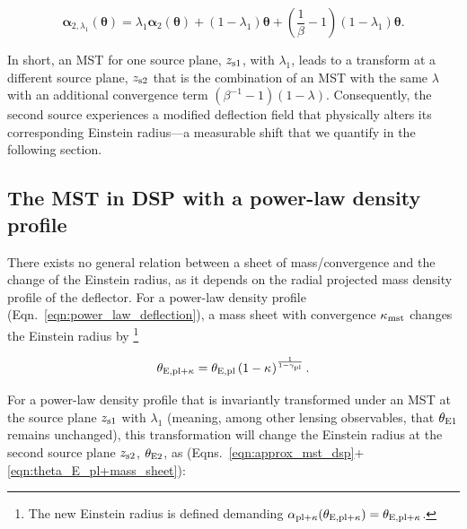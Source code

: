\documentclass[a4paper,11pt]{article}
\begin{document}
\begin{equation} \label{eqn:approx_mst_dsp}
    \boldsymbol{\alpha}_{2, \lambda_1}(\boldsymbol{\theta}) = \lambda_1 \boldsymbol{\alpha}_2(\boldsymbol{\theta}) + (1 - \lambda_{1}) \boldsymbol{\theta} + \left(\frac{1}{\beta} - 1 \right)\left(1 - \lambda_1\right)\boldsymbol{\theta}.
\end{equation}

In short, an MST for one source plane, $z_{\rm s1}$, with $\lambda_1$, leads to a transform at a different source plane, $z_{\rm s2}$ that is the combination of an MST with the same $\lambda$ with an additional convergence term $(\beta^{-1} -1)(1-\lambda)$. Consequently, the second source experiences a modified deflection field that physically alters its corresponding Einstein radius—a measurable shift that we quantify in the following section.


\subsection{The MST in DSP with a power-law density profile}

There exists no general relation between a sheet of mass/convergence and the change of the Einstein radius, as it depends on the radial projected mass density profile of the deflector.
For a power-law density profile (Eqn.~\ref{eqn:power_law_deflection}), a mass sheet with convergence $\kappa_{\rm mst}$ changes the Einstein radius by
\footnote{The new Einstein radius is defined demanding $\alpha_{{\rm pl}+\kappa}(\theta_{\rm E, pl+\kappa}) = \theta_{\rm E, pl+\kappa}$.}

\begin{equation}\label{eqn:theta_E_pl+mass_sheet}
    \theta_{{\rm E, pl}+\kappa} = \theta_{\rm E, pl} \left(1 -\kappa_{\rm } \right)^{\frac{1}{1 -\gamma_{\rm pl}}}.
\end{equation}

For a power-law density profile that is invariantly transformed under an MST at the source plane $z_{\rm s1}$ with $\lambda_1$ (meaning, among other lensing observables, that $\theta_{\rm E1}$ remains unchanged), this transformation will change the Einstein radius at the second source plane $z_{\rm s2}$, $\theta_{\rm E2}$, as (Eqns.~\ref{eqn:approx_mst_dsp}+\ref{eqn:theta_E_pl+mass_sheet}):
\end{document}
